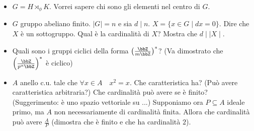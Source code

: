 \documentclass[a4paper,11pt,NoNotes,GeneralMath]{stdmdoc}
\begin{document}
\begin{itemize}
		\item $G = H \rtimes_\phi K$. Vorrei sapere chi sono gli elementi nel centro di $G$.
		\item $G$ gruppo abeliano finito. $\mid G \mid = n$ e sia $d \mid n$. $X = \{ x \in G \mid dx = 0 \}$. Dire che $X$ è un sottogruppo. Qual è la cardinalità di $X$? Mostra che $d \mid \mid X \mid$.
		\item Quali sono i gruppi ciclici della forma $\left( \frac{\bbZ}{m \bbZ} \right) ^{*}$? (Va dimostrato che $\left( \frac{\bbZ}{p^\alpha \bbZ} \right) ^ {*}$ è ciclico)
		\item $A$ anello c.u. tale che $\forall x \in A \quad x^2 = x$. Che caratteristica ha? (Può avere caratteristica arbitraria?) Che cardinalità può avere se è finito? (Suggerimento: è uno spazio vettoriale su ...) Supponiamo ora $P \subseteq A$ ideale primo, ma $A$ non necessariamente di cardinalità finita. Allora che cardinalità può avere $\frac{A}{P}$ (dimostra che è finito e che ha cardinalità $2$).
    \end{itemize}
    
\end{document}
